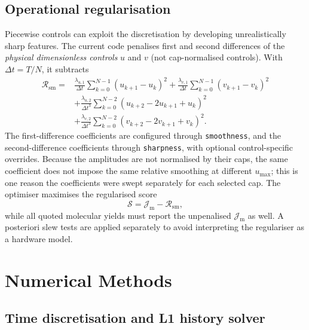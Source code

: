 \documentclass[9pt,a4paper,twocolumn,twoside]{rho-class/rho}
\newcommand{\Jmol}{\mathcal{J}_{\mathrm{m}}}
\newcommand{\Rsm}{\mathcal{R}_{\mathrm{sm}}}
\begin{document}
    \subsection{Operational regularisation}

        Piecewise controls can exploit the discretisation by developing unrealistically sharp features. The current code penalises first and second differences of the \emph{physical dimensionless controls} $u$ and $v$ (not cap-normalised controls). With $\Delta t=T/N$, it subtracts
        \begin{equation}\label{eq:smoothness}
            \begin{aligned}
            \Rsm={}&\frac{\lambda_{u,1}}{\Delta t}
                \sum_{k=0}^{N-1}(u_{k+1}-u_k)^2
            +\frac{\lambda_{v,1}}{\Delta t}
                \sum_{k=0}^{N-1}(v_{k+1}-v_k)^2\\
            &+\frac{\lambda_{u,2}}{\Delta t^3}
                \sum_{k=0}^{N-2}(u_{k+2}-2u_{k+1}+u_k)^2\\
            &+\frac{\lambda_{v,2}}{\Delta t^3}
                \sum_{k=0}^{N-2}(v_{k+2}-2v_{k+1}+v_k)^2.
            \end{aligned}
        \end{equation}
        The first-difference coefficients are configured through
        \texttt{smoothness}, and the second-difference coefficients through
        \texttt{sharpness}, with optional control-specific overrides. Because
        the amplitudes are not normalised by their caps, the same coefficient
        does not impose the same relative smoothing at different $u_{\max}$;
        this is one reason the coefficients were swept separately for each
        selected cap. The optimiser maximises the regularised score
        \begin{equation}\label{eq:score}
            \mathcal{S}=\Jmol-\Rsm,
        \end{equation}
        while all quoted molecular yields must report the unpenalised $\Jmol$ as well. A posteriori slew tests are applied separately to avoid interpreting the regulariser as a hardware model.

\section{Numerical Methods}\label{sec:numerics}

    \subsection{Time discretisation and L1 history solver}
\end{document}
